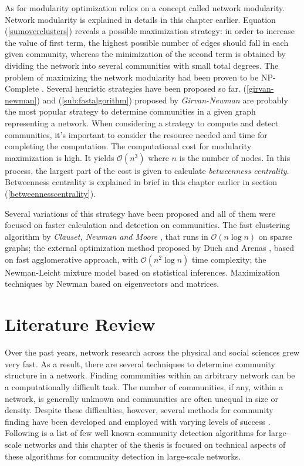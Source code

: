 As for modularity optimization relies on a concept called network modularity. Network modularity is explained in details in this chapter earlier. Equation (\ref{sumoverclusters}) reveals a possible maximization strategy: in order to increase the value of first term, the highest possible number of edges should fall in each given community, whereas the minimization of the second term is obtained by dividing the network into several communities with small total degrees. The problem of maximizing the network modularity had been proven to be NP-Complete \cite{ref-30}. Several heuristic strategies have been proposed so far. (\ref{girvan-newman}) and (\ref{sub:fastalgorithm}) proposed by \textit{Girvan-Newman} are probably the most popular strategy to determine communities in a given graph representing a network. When considering a strategy to compute and detect communities, it's important to consider the resource needed and time for completing the computation. The computational cost for modularity maximization is high. It yields $\mathcal{O}(n^{3})$ where $n$ is the number of nodes. In this process, the largest part of the cost is given to calculate \textit{betweenness centrality}. Betweenness centrality is explained in brief in this chapter earlier in section (\ref{betweennesscentrality}).

Several variations of this strategy have been proposed and all of them were focused on faster calculation and detection on communities. The fast clustering algorithm by \textit{Clauset, Newman and Moore} \cite{ref-31}, that runs in $\mathcal{O}(n \log n)$ on sparse graphs; the external optimization method proposed by Duch and Arenas \cite{ref-32}, based on fast agglomerative approach, with $\mathcal{O}(n^2 \log n)$ time complexity; the Newman-Leicht \cite{ref-33} mixture model based on statistical inferences. Maximization techniques by Newman \cite{ref-34} based on eigenvectors and matrices.

\section{Literature Review}\label{sec:literature_review}
Over the past years, network research across the physical and social sciences grew very fast\cite{ref-25}. As a result, there are several techniques to determine community structure in a network. Finding communities within an arbitrary network can be a computationally difficult task. The number of communities, if any, within a network, is generally unknown and communities are often unequal in size or density. Despite these difficulties, however, several methods for community finding have been developed and employed with varying levels of success \cite{ref-2}. Following is a list of few well known community detection algorithms for large-scale networks and this chapter of the thesis is focused on technical aspects of these algorithms for community detection in large-scale networks.

